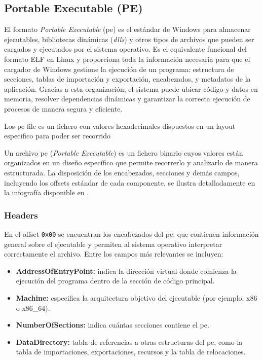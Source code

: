 \subsection{Portable Executable (PE)}

El formato \textit{Portable Executable} (\acrshort{pe}) es el estándar de Windows para almacenar ejecutables, bibliotecas dinámicas (\textit{\acrshort{dll}s}) y otros tipos de archivos que pueden ser cargados y ejecutados por el sistema operativo.  
Es el equivalente funcional del formato ELF en Linux y proporciona toda la información necesaria para que el cargador de Windows gestione la ejecución de un programa: estructura de secciones, tablas de importación y exportación, encabezados, y metadatos de la aplicación.  
Gracias a esta organización, el sistema puede ubicar código y datos en memoria, resolver dependencias dinámicas y garantizar la correcta ejecución de procesos de manera segura y eficiente.

Los \acrshort{pe} file es un fichero con valores hexadecimales dispuestos en un layout especifico para poder ser recorrido

Un archivo \acrshort{pe} (\textit{Portable Executable}) es un fichero binario cuyos valores están organizados en un diseño específico que permite recorrerlo y analizarlo de manera estructurada.  
La disposición de los encabezados, secciones y demás campos, incluyendo los offsets estándar de cada componente, se ilustra detalladamente en la infografía disponible en \cite{peinfografia}.

\subsubsection{Headers}

En el offset \texttt{0x00} se encuentran los encabezados del \acrshort{pe}, que contienen información general sobre el ejecutable y permiten al sistema operativo interpretar correctamente el archivo. Entre los campos más relevantes se incluyen:

\begin{itemize}
    \item \textbf{AddressOfEntryPoint:} indica la dirección virtual donde comienza la ejecución del programa dentro de la sección de código principal.
    \item \textbf{Machine:} especifica la arquitectura objetivo del ejecutable (por ejemplo, x86 o x86\_64).
    \item \textbf{NumberOfSections:} indica cuántas secciones contiene el \acrshort{pe}.
    \item \textbf{DataDirectory:} tabla de referencias a otras estructuras del \acrshort{pe}, como la tabla de importaciones, exportaciones, recursos y la tabla de relocaciones.
\end{itemize}

